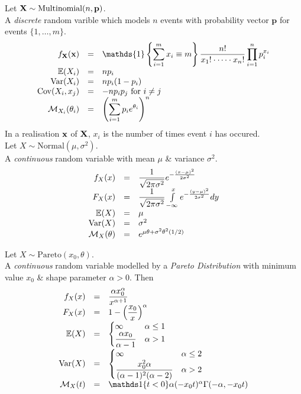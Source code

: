 \documentclass[11pt,a4paper]{article}
\begin{document}
Let $\textbf{X}\sim\text{Multinomial}(n,\textbf{p})$.\\
A \textit{discrete} random varible which models $n$ events with probability vector $\textbf{p}$ for events $\{1,\dots,m\}$.\\
\[\begin{array}{rcl}
f_\X(\x)&=&{\displaystyle\mathds{1}\left\{\sum_{i=1}^mx_i\equiv m\right\}\frac{n!}{x_1!\cdot\dots\cdot x_n!}\prod_{i=1}^np_i^{x_i}}\\
\expect(X_i)&=&np_i\\
\var(X_i)&=&np_i(1-p_i)\\
\cov(X_i,x_j)&=&-np_ip_j\text{ for }i\neq j\\
\mathcal{M}_{X_i}(\theta_i)&=&\left(\displaystyle\sum_{i=1}^mp_ie^{\theta_i}\right)^n
\end{array}\]
\nb In a realisation $\textbf{x}$ of $\textbf{X}$, $x_i$ is the number of times event $i$ has occured.\\

Let $X\sim\text{Normal}(\mu,\sigma^2)$.\\
A \textit{continuous} random variable  with mean $\mu$ \& variance $\sigma^2$.
\[\begin{array}{rcl}
f_X(x)&=&\dfrac{1}{\sqrt{2\pi\sigma^2}}e^{-\frac{(x-\mu)^2}{2\sigma^2}}\\
F_X(x)&=&\dfrac{1}{\sqrt{2\pi\sigma^2}}\int\limits_{-\infty}^xe^{-\frac{(y-\mu)^2}{2\sigma^2}}dy\\
\mathbb{E}(X)&=&\mu\\
\mathrm{Var}(X)&=&\sigma^2\\
\mathcal{M}_X(\theta)&=&e^{\mu\theta+\sigma^2\theta^2(1/2)}
\end{array}\]

Let $X\sim\text{Pareto}(x_0,\theta)$.\\
A \textit{continuous} random variable modelled by a \textit{Pareto Distribution} with minimum value $x_0$ \& shape parameter $\alpha>0$. Then
\[\begin{array}{rcll}
f_X(x)&=&\dfrac{\alpha x_0^\alpha}{x^{\alpha+1}}\\
F_X(x)&=&1-\left(\dfrac{x_0}{x}\right)^\alpha\\
\expect(X)&=&\begin{cases}\infty&\alpha\leq1\\\dfrac{\alpha x_0}{\alpha-1}&\alpha>1\end{cases}\\
\var(X)&=&\begin{cases}\infty&\alpha\leq2\\\dfrac{x_0^2\alpha}{(\alpha-1)^2(\alpha-2)}&\alpha>2\end{cases}\\
\mathcal{M}_X(t)&=&\indicator\{t<0\}\alpha(-x_0t)^\alpha\Gamma(-\alpha,-x_0t)
\end{array}\]
\end{document}
